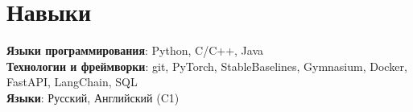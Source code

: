 \documentclass[english,russian,letterpaper,11pt]{article}
\begin{document}
\section{Навыки}
 \begin{itemize}[leftmargin=0.15in, label={}]
    \small{\item{
     \textbf{Языки программирования}{: Python, C/C++, Java} \\
     \textbf{Технологии и фреймворки}{: git, PyTorch, StableBaselines, Gymnasium, Docker, FastAPI, LangChain, SQL } \\
     \textbf{Языки}{: Русский, Английский (C1)} \\
    }}
 \end{itemize}

\end{document}
